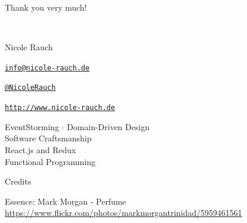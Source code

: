 \begin{frame}{Thank you very much!}

  ~\\[1em]
  \begin{block}{Nicole Rauch}
    \begin{description}[Twitterxx]
    \item[E-Mail]  \href{mailto:info@nicole-rauch.de}{\texttt{info@nicole-rauch.de}}
    \item[Twitter] \href{http://twitter.com/NicoleRauch}{\texttt{@NicoleRauch}}
    \item[Web] \href{http://www.nicole-rauch.de}{\texttt{http://www.nicole-rauch.de}}
    \end{description}
  \end{block}

\begin{center}
EventStorming $\cdot$ Domain-Driven Design \\
Software Craftsmanship \\ 
React.js and Redux  \\
Functional Programming
\end{center}  

\end{frame}


\begin{frame}{Credits}

Essence: Mark Morgan - Perfume
{\footnotesize \url{https://www.flickr.com/photos/markmorgantrinidad/5959461561}}


\end{frame}
